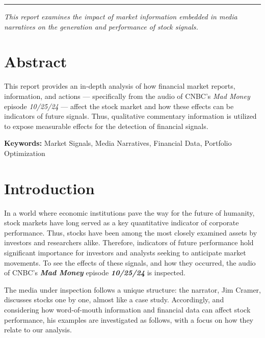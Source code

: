 \documentclass[12pt,a4paper]{article}
\begin{document}
\begin{titlepage}
    \vspace{1.2cm}

    {\color{SUblue}\rule{\textwidth}{0.8pt}}\par
    \vspace{0.2cm}
   {\small \textit{This report examines the impact of market information embedded in media narratives on the generation and performance of stock signals.}}

\end{titlepage}

\setcounter{page}{1}

\newpage
\section*{Abstract}
This report provides an in-depth analysis of how financial market reports, information, and actions --- specifically from the audio of CNBC's \textit{Mad Money} episode \textit{10/25/24} --- affect the stock market and how these effects can be indicators of future signals. Thus, qualitative commentary information is utilized to expose measurable effects for the detection of financial signals.

\vspace{1cm}
\textbf{Keywords:} Market Signals, Media Narratives, Financial Data, Portfolio Optimization

\section*{Introduction}
In a world where economic institutions pave the way for the future of humanity, 
stock markets have long served as a key quantitative indicator of corporate performance. 
Thus, stocks have been among the most closely examined assets by investors and researchers alike. 
Therefore, indicators of future performance hold significant importance for investors and analysts seeking to anticipate market movements. 
To see the effects of these signals, and how they occurred, the audio of CNBC's \textbf{\textit{Mad Money}} episode \textit{\textbf{10/25/24}} is inspected.

\vspace{1cm}
The media under inspection follows a unique structure: the narrator, Jim Cramer, 
discusses stocks one by one, almost like a case study. 
Accordingly, and considering how word-of-mouth information and financial data 
can affect stock performance, his examples are investigated as follows, 
with a focus on how they relate to our analysis.
\end{document}
